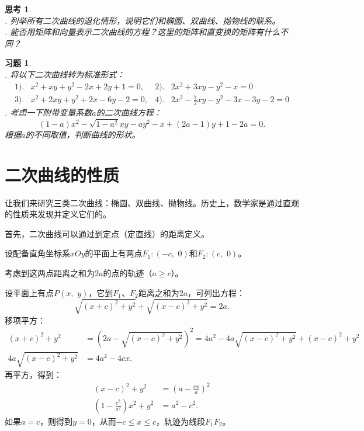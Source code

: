\documentclass[12pt,UTF8]{ctexbook}
\theoremstyle{definition}
\theoremstyle{plain}
\newtheorem{sk}{思考}[section]
\newtheorem{xt}{习题}[section]
\begin{document}
\begin{sk}
    \mbox{} \\
    . 列举所有二次曲线的退化情形，说明它们和椭圆、双曲线、抛物线的联系。\\
    . 能否用矩阵和向量表示二次曲线的方程？这里的矩阵和直变换的矩阵有什么不同？
\end{sk}

\begin{xt}
    \mbox{} \\
    . 将以下二次曲线转为标准形式：
    \begin{align*}
        1).& x^2 + xy +y^2 - 2x + 2y + 1 = 0,  &2).& 2x^2 + 3xy -y^2 - x = 0 \\
        3).& x^2 + 2xy + y^2 + 2x - 6y - 2 = 0,  & 4).& 2x^2 - \frac{7}{2}xy - y^2 - 3x - 3y - 2 = 0 
    \end{align*}
    . 考虑一下附带变量系数$a$的二次曲线方程：
    $$ (1 - a)x^2 - \sqrt{1 - a^2}xy - ay^2 - x + (2a - 1)y + 1 - 2a = 0. $$
    根据$a$的不同取值，判断曲线的形状。
\end{xt}

\section{二次曲线的性质}

让我们来研究三类二次曲线：椭圆、双曲线、抛物线。历史上，数学家是通过直观的性质来发现并定义它们的。

首先，二次曲线可以通过到定点（定直线）的距离定义。

设配备直角坐标系$xOy$的平面上有两点$F_1:(-c,\,\,0)$和$F_2:(c,\,\,0)$。

考虑到这两点距离之和为$2a$的点的轨迹（$a\geqslant c$）。

设平面上有点$P(x, \,\,y)$，它到$F_1$、$F_2$距离之和为$2a$，可列出方程：
$$ \sqrt{(x + c)^2 + y^2} + \sqrt{(x - c)^2 + y^2} = 2a.$$
移项平方：
\begin{align*}
    (x + c)^2 + y^2 &= (2a - \sqrt{(x - c)^2 + y^2})^2 = 4a^2 - 4a\sqrt{(x - c)^2 + y^2} + (x - c)^2 + y^2 \\
    4a\sqrt{(x - c)^2 + y^2} &= 4a^2 - 4cx.
\end{align*}
再平方，得到：
\begin{align*}
    (x - c)^2 + y^2 &= \left(a - \frac{cx}{a}\right)^2 \\
    (1 - \frac{c^2}{a^2})x^2 + y^2 &= a^2 - c^2.
\end{align*}
如果$a = c$，则得到$y = 0$，从而$-c \leqslant x \leqslant c$，轨迹为线段$F_1F_2$。
\end{document}
